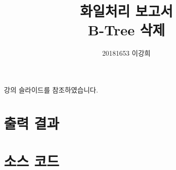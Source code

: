 \documentclass[10pt]{article}
\title{화일처리 보고서\\B-Tree 삭제}
\author{20181653 이강희}
\begin{document}
\maketitle

\begin{center}
강의 슬라이드를 참조하였습니다.
\end{center}

\newpage

\section{출력 결과}



\section{소스 코드}

\inputminted[frame=lines, linenos]{cpp}{main.cpp}
\end{document}
